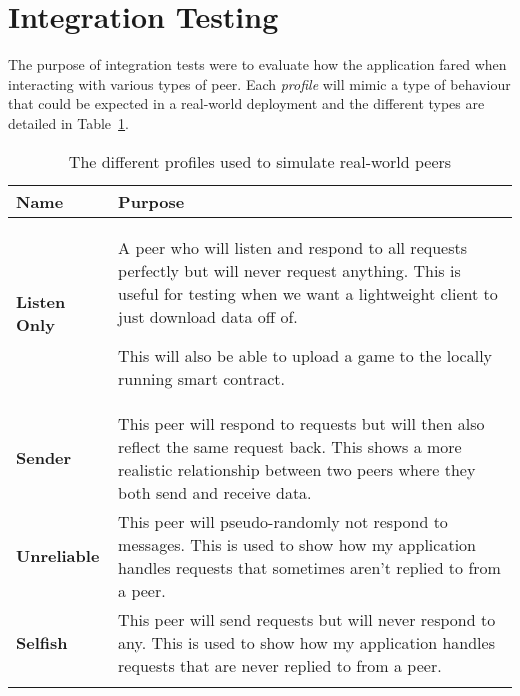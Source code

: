 \section{Integration Testing}

The purpose of integration tests were to evaluate how the application fared when interacting with various types of peer. Each \textit{profile} will mimic a type of behaviour that could be expected in a real-world deployment and the different types are detailed in Table~\ref{tab:profiles}.

\small
\begin{longtable}{p{} p{}}
  \toprule
  \textbf{Name} & \textbf{Purpose}
  \\\midrule\midrule
  \textbf{Listen Only}
  & A peer who will listen and respond to all requests perfectly but will never request anything. This is useful for testing when we want a lightweight client to just download data off of. 
  
  This will also be able to upload a game to the locally running smart contract.
  \\
  \textbf{Sender}
  & This peer will respond to requests but will then also reflect the same request back. This shows a more realistic relationship between two peers where they both send and receive data.
  \\
  \textbf{Unreliable}
  & This peer will pseudo-randomly not respond to messages. This is used to show how my application handles requests that sometimes aren't replied to from a peer.
  \\
  \textbf{Selfish}
  & This peer will send requests but will never respond to any. This is used to show how my application handles requests that are never replied to from a peer.
  \\\bottomrule\bottomrule
  \caption{The different profiles used to simulate real-world peers}
  \label{tab:profiles}
\end{longtable}
\normalsize
